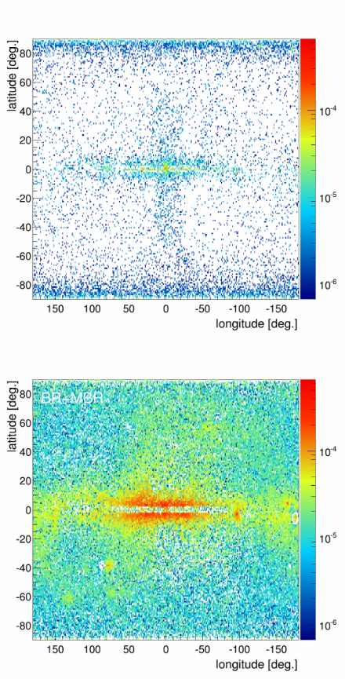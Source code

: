 \begin{figure}[H]
\begin{minipage}[h]{0.45\textwidth}
	  \subcaption{}
	  \label{}
  \end{minipage}
  \hfill
  \begin{minipage}[h]{0.45\textwidth}
	  \centering
	  \includegraphics[width=1.\linewidth]{pic/discussion/MBR_MBR_Integral.png}
	  \subcaption{}
	  \label{}
  \end{minipage}
  \hfill
  \begin{minipage}[h]{0.45\textwidth}
	  \centering
	  \includegraphics[width=1.\linewidth]{pic/discussion/MBR_BR+MBR_Integral.png}

\end{minipage}
\end{figure}
